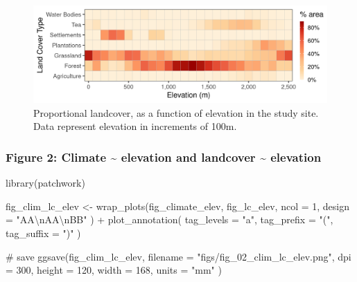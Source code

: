 \documentclass[]{article}
\newenvironment{Shaded}{}{}
\newcommand{\CharTok}[1]{\textcolor[rgb]{0.00,0.50,0.50}{#1}}
\newcommand{\CommentTok}[1]{\textcolor[rgb]{0.00,0.50,0.00}{#1}}
\newcommand{\DataTypeTok}[1]{#1}
\newcommand{\DecValTok}[1]{#1}
\newcommand{\KeywordTok}[1]{\textcolor[rgb]{0.00,0.00,1.00}{#1}}
\newcommand{\NormalTok}[1]{#1}
\newcommand{\OperatorTok}[1]{#1}
\newcommand{\StringTok}[1]{\textcolor[rgb]{0.00,0.50,0.50}{#1}}
\begin{document}
\begin{figure}
\centering
\includegraphics{figs/fig_lc_elev.png}
\caption{Proportional landcover, as a function of elevation in the study site. Data represent elevation in increments of 100m.}
\end{figure}

\hypertarget{figure-2-climate-elevation-and-landcover-elevation}{%
\subsubsection{Figure 2: Climate \textasciitilde{} elevation and landcover \textasciitilde{} elevation}\label{figure-2-climate-elevation-and-landcover-elevation}}

\begin{Shaded}
\begin{Highlighting}[]
\KeywordTok{library}\NormalTok{(patchwork)}
\end{Highlighting}
\end{Shaded}

\begin{Shaded}
\begin{Highlighting}[]
\NormalTok{fig_clim_lc_elev <-}
\StringTok{  }\KeywordTok{wrap_plots}\NormalTok{(fig_climate_elev, fig_lc_elev,}
    \DataTypeTok{ncol =} \DecValTok{1}\NormalTok{,}
    \DataTypeTok{design =} \StringTok{"AA}\CharTok{\textbackslash{}n}\StringTok{AA}\CharTok{\textbackslash{}n}\StringTok{BB"}
\NormalTok{  ) }\OperatorTok{+}
\StringTok{  }\KeywordTok{plot_annotation}\NormalTok{(}
    \DataTypeTok{tag_levels =} \StringTok{"a"}\NormalTok{,}
    \DataTypeTok{tag_prefix =} \StringTok{"("}\NormalTok{,}
    \DataTypeTok{tag_suffix =} \StringTok{")"}
\NormalTok{  )}

\CommentTok{# save}
\KeywordTok{ggsave}\NormalTok{(fig_clim_lc_elev,}
  \DataTypeTok{filename =} \StringTok{"figs/fig_02_clim_lc_elev.png"}\NormalTok{,}
  \DataTypeTok{dpi =} \DecValTok{300}\NormalTok{,}
  \DataTypeTok{height =} \DecValTok{120}\NormalTok{, }\DataTypeTok{width =} \DecValTok{168}\NormalTok{, }\DataTypeTok{units =} \StringTok{"mm"}
\NormalTok{)}
\end{Highlighting}
\end{Shaded}
\end{document}
